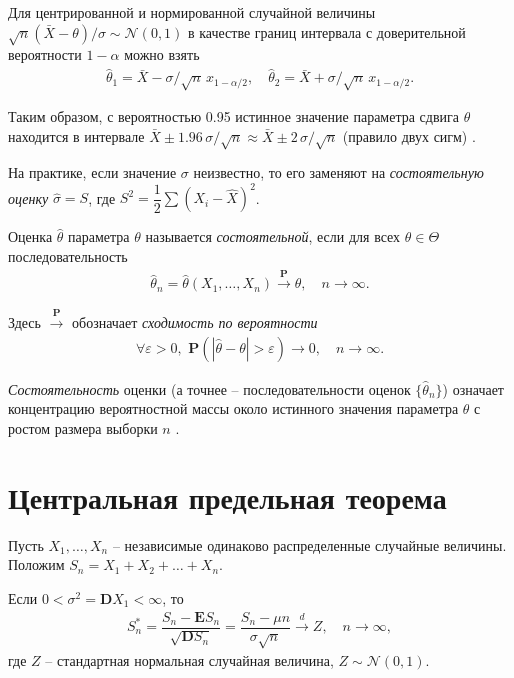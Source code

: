 \documentclass[%
	11pt,
	a4paper,
	utf8,
		]{article}
\begin{document}
Для центрированной и нормированной случайной величины $ \sqrt{n}(\bar{X} - \theta)/\sigma \sim \mathcal{N}(0,1) $ в качестве границ интервала с доверительной вероятности $ 1 - \alpha $ можно взять
\begin{align*}
	\hat{\theta}_1 = \bar{X} - \sigma/\sqrt{n} \, x_{1 - \alpha/2}, \quad \hat{\theta}_2 = \bar{X} + \sigma/\sqrt{n} \, x_{1 - \alpha/2}.
\end{align*}

Таким образом, с вероятностью 0.95 истинное значение параметра сдвига $ \theta $ находится в интервале $ \bar{X} \pm 1.96\, \sigma/\sqrt{n} \approx \bar{X} \pm 2\, \sigma/\sqrt{n} $ (правило двух сигм) \cite[147]{lagutin:2009}.

На практике, если значение $ \sigma $ неизвестно, то его заменяют на \emph{состоятельную оценку} $ \hat{\sigma} = S $, где $ S^2 = \dfrac{1}{2}\sum (X_i - \hat{X})^2 $.

Оценка $ \hat{\theta} $ параметра $ \theta $ называется \emph{состоятельной}, если для всех $ \theta \in \Theta $ последовательность
\begin{align*}
	\hat{\theta}_n = \hat{\theta}(X_1, \dots, X_n) \xrightarrow{\mathbf{P}} \theta, \quad n \to \infty.
\end{align*}

Здесь $ \xrightarrow{\mathbf{P}} $ обозначает \emph{сходимость по вероятности}
\begin{align*}
	\forall \varepsilon > 0, \,\, \mathbf{P}( | \hat{\theta} - \theta | > \varepsilon ) \to 0, \quad n \to \infty.
\end{align*}

\emph{Состоятельность} оценки (а точнее -- последовательности оценок $ \{\hat{\theta}_n\} $) означает концентрацию вероятностной массы около истинного значения параметра $ \theta $ с ростом размера выборки $ n $ \cite[75]{lagutin:2009}.

\section{Центральная предельная теорема}

Пусть $ X_1,\dots, X_n $ -- независимые одинаково распределенные случайные величины. Положим $ S_n = X_1 + X_2 + \dots + X_n $.

Если $ 0 < \sigma^2 = \mathbf{D}X_1 < \infty $, то
\begin{align*}
	S^{*}_n = \dfrac{ S_n - \mathbf{E}S_n }{ \sqrt{\mathbf{D} S_n} } = \dfrac{S_n - \mu n}{\sigma \sqrt{n}} \xrightarrow{d} Z, \quad n \to \infty,
\end{align*}
где $ Z $ -- стандартная нормальная случайная величина, $ Z \sim \mathcal{N}(0, 1) $.
\end{document}
